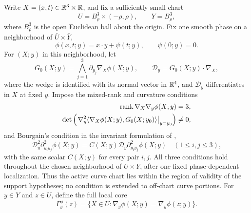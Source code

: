 Write \(X=(x,t)\in\mathbb R^3\times\mathbb R\), and fix a sufficiently small chart
\[
 U=B_\rho^3\times(-\rho,\rho),\qquad Y=B_\rho^3,
\]
where \(B_\rho^3\) is the open Euclidean ball about the origin. Fix one
smooth phase on a neighborhood of \(\overline U\times\overline Y\),
\[
 \phi(x,t;y)=x\cdot y+\psi(t;y),\qquad \psi(0;y)=0.
\]
For \((X;y)\) in this neighborhood, let
\[
 G_0(X;y)=\bigwedge_{j=1}^3\partial_{y_j}\nabla_X\phi(X;y),
 \qquad \mathcal D_y=G_0(X;y)\cdot\nabla_X,
\]
where the wedge is identified with its normal vector in \(\mathbb R^4\),
and \(\mathcal D_y\) differentiates in \(X\) at fixed \(y\).
Impose the mixed-rank and curvature conditions
\[
 \begin{aligned}
 \operatorname{rank}\nabla_X\nabla_y\phi(X;y)&=3,\\
 \det\left(\left.\nabla_y^2
   \langle\nabla_X\phi(X;y),G_0(X;y_0)\rangle
   \right|_{y=y_0}\right)&\ne0,
 \end{aligned}
\]
and Bourgain's condition in the invariant formulation of
\citet[Theorem~2.1]{GuoWangZhangDichotomy},
\[
 \mathcal D_y^2\partial_{y_i y_j}^2\phi(X;y)
 =C(X;y)\mathcal D_y\partial_{y_i y_j}^2\phi(X;y)
 \quad(1\le i,j\le3),
\]
with the same scalar \(C(X;y)\) for every pair \(i,j\).
All three conditions hold throughout the chosen neighborhood of
\(\overline U\times\overline Y\), after one fixed phase-dependent
localization. Thus the active curve chart lies within the region of
validity of the support hypotheses; no condition is extended to
off-chart curve portions. For \(y\in Y\) and \(z\in U\), define the
full local core
\[
 \Gamma_y^\phi(z)
 =\{X\in U:\nabla_y\phi(X;y)=\nabla_y\phi(z;y)\}.
\]

